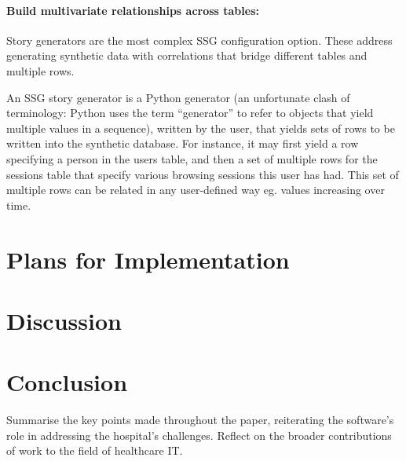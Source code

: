 \documentclass[11pt]{article}
\begin{document}
\paragraph{Build multivariate relationships across tables:}

Story generators are the most complex SSG configuration option. These address generating synthetic data with correlations that bridge different tables and multiple rows.

An SSG story generator is a Python generator (an unfortunate clash of terminology: Python uses the term “generator” to refer to objects that yield multiple values in a sequence), written by the user, that yields sets of rows to be written into the synthetic database. For instance, it may first yield a row specifying a person in the users table, and then a set of multiple rows for the sessions table that specify various browsing sessions this user has had. This set of multiple rows can be related in any user-defined way eg. values increasing over time.


\section{Plans for Implementation}


\section{Discussion}

\section{Conclusion}
Summarise the key points made throughout the paper, reiterating the software's role in addressing the hospital's challenges.
Reflect on the broader contributions of work to the field of healthcare IT.



\end{document}
